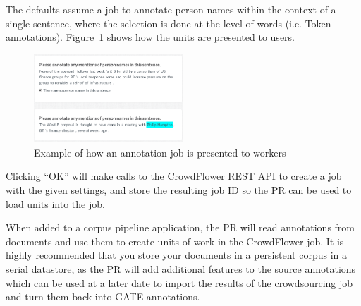 The defaults assume a job to annotate person names within the context of a
single sentence, where the selection is done at the level of words (i.e. Token
annotations).  Figure~\ref{fig:crowd:sample-annotation-job} shows how the units
are presented to users.
\begin{figure}[tb]
  \centering
  \includegraphics[width=0.5\textwidth]{example-cf-annotation-job.png}
  \caption{Example of how an annotation job is presented to workers}
  \label{fig:crowd:sample-annotation-job}
\end{figure}


Clicking ``OK'' will make calls to the CrowdFlower REST API to create a job
with the given settings, and store the resulting job ID so the PR can be used
to load units into the job.


When added to a corpus pipeline application, the PR will read annotations from
documents and use them to create units of work in the CrowdFlower job.  It is
highly recommended that you store your documents in a persistent corpus in a
serial datastore, as the PR will add additional features to the source
annotations which can be used at a later date to import the results of the
crowdsourcing job and turn them back into GATE annotations.


